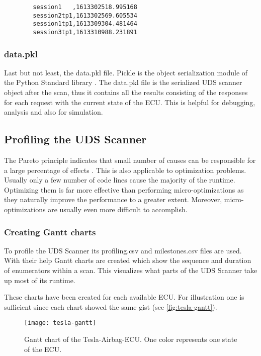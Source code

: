 \begin{samepage}
    \begin{verbatim}
        session1   ,1613302518.995168
        session2tp1,1613302569.605534
        session1tp1,1613309304.481464
        session3tp1,1613310988.231891
    \end{verbatim}
\end{samepage}

\subsubsection{data.pkl}

Last but not least, the data.pkl file. Pickle is the object serialization module of the Python Standard library \cite{pickle}. The data.pkl file is the serialized UDS scanner object after the scan, thus it contains all the results consisting of the responses for each request with the current state of the ECU. This is helpful for debugging, analysis and also for simulation.


\subsection{Profiling the UDS Scanner}

The Pareto principle indicates that small number of causes can be responsible for a large percentage of effects \cite{pareto}. This is also applicable to optimization problems. Usually only a few number of code lines cause the majority of the runtime. Optimizing them is far more effective than performing micro-optimizations as they naturally improve the performance to a greater extent. Moreover, micro-optimizations are usually even more difficult to accomplish.

\subsubsection{Creating Gantt charts}

To profile the UDS Scanner its profiling.csv and milestones.csv files are used. With their help Gantt charts are created which show the sequence and duration of enumerators within a scan. This visualizes what parts of the UDS Scanner take up most of its runtime.

These charts have been created for each available ECU. For illustration one is sufficient since each chart showed the same gist (see \autoref{fig:tesla-gantt}).

\begin{figure}[h]
    \centering
    \texttt{[image: tesla-gantt]}
    \caption{Gantt chart of the Tesla-Airbag-ECU. One color represents one state of the ECU.}
    \label{fig:tesla-gantt}
\end{figure}


